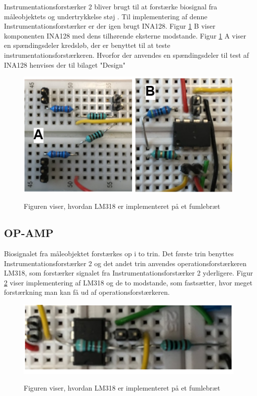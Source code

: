 Instrumentationsforstærker 2 bliver brugt til at forstærke biosignal fra måleobjektets og undertrykkelse støj . Til implementering af denne Instrumentationsforstærker er der igen brugt INA128. Figur \ref{figINAogSpandeler} B viser komponenten INA128 med dens tilhørende eksterne modstande. Figur \ref{figINAogSpandeler} A viser en spændingsdeler kredsløb, der er benyttet til at teste instrumentationsforstærkeren. Hvorfor der anvendes en spændingsdeler til test af INA128 henvises der  til bilaget "Design" 


 

\begin{figure}[H] 
\centering
{\includegraphics[width=\linewidth]
{Figure/INA128ogSpDelerIM}}
\caption{Figuren viser, hvordan LM318 er implementeret på et fumlebræt  }
\label{figINAogSpandeler}
\end{figure}

\subsection{OP-AMP}

Biosignalet fra måleobjektet forstærkes op i to trin. Det første trin benyttes Instrumentationsforstærker 2 og det andet trin anvendes operationsforstærkeren LM318, som forstærker signalet fra Instrumentationsforstærker 2 yderligere. Figur \ref{opamp} viser implementering af LM318 og de to modstande, som fastsætter, hvor meget forstærkning man kan få ud af operationsforstærkeren. 



\begin{figure}[H] 
\centering
{\includegraphics[width=\linewidth]
{Figure/OP-AMPIM}}
\caption{Figuren viser, hvordan LM318 er implementeret på et fumlebræt  }
\label{opamp}
\end{figure}



